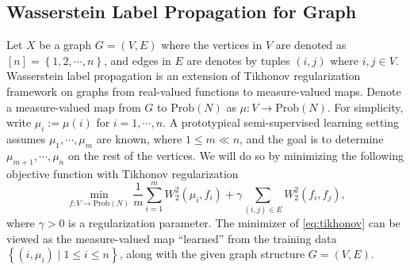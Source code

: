 \documentclass[letterpaper]{article} %
\begin{document}
\subsection{Wasserstein Label Propagation for Graph}
Let $X$ be a graph $G= \left( V,E \right)$ where the vertices in $V$ are denoted as $\left[ n \right]=\left\{ 1,2,\cdots,n \right\}$, and edges in $E$ are denotes by tuples $\left( i,j \right)$ where $i,j\in V$. Wasserstein label propagation is an extension of Tikhonov regularization framework on graphs \cite{Belkin2004} from real-valued functions to measure-valued maps. 
Denote a measure-valued map from $G$ to $\mathrm{Prob}\left( N \right)$ as $\mu:V\rightarrow\mathrm{Prob}\left( N \right)$. For simplicity, write $\mu_i:=\mu \left( i \right)$ for $i=1,\cdots,n$. A prototypical semi-supervised learning setting assumes $\mu_1,\cdots,\mu_m$ are known, where $1\leq m \ll n$, and the goal is to determine $\mu_{m+1},\cdots,\mu_n$ on the rest of the vertices. We will do so by minimizing the following objective function with Tikhonov regularization
\begin{equation}
  \label{eq:tikhonov}
  \min_{f:V\rightarrow \mathrm{Prob}\left( N \right)}\frac{1}{m}\sum_{i=1}^m W^2_2 \left( \mu_i,f_i \right)+\gamma\sum_{\left( i,j \right)\in E}W^2_2 \left( f_i,f_j \right),
\end{equation}
where $\gamma>0$ is a regularization parameter.
The minimizer of \eqref{eq:tikhonov} can be viewed as the measure-valued map ``learned'' from the training data $\left\{ \left( i,\mu_i \right)\mid 1\leq i\leq n \right\}$, along with the given graph structure $G= \left( V,E \right)$. 
\end{document}
